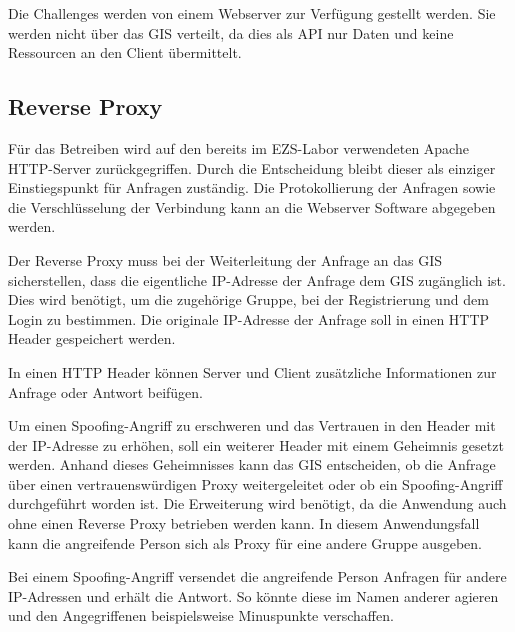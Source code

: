 Die Challenges werden von einem Webserver zur Verfügung gestellt werden. Sie werden nicht über das GIS verteilt, da dies als API nur Daten und keine Ressourcen an den Client übermittelt.

\subsection{Reverse Proxy}
Für das Betreiben wird auf den bereits im EZS-Labor verwendeten Apache HTTP-Server zurückgegriffen. Durch die Entscheidung bleibt dieser als einziger Einstiegspunkt für Anfragen zuständig. Die Protokollierung der Anfragen sowie die Verschlüsselung der Verbindung kann an die Webserver Software abgegeben werden.

Der Reverse Proxy muss bei der Weiterleitung der Anfrage an das GIS sicherstellen, dass die eigentliche IP-Adresse der Anfrage dem GIS zugänglich ist. Dies wird benötigt, um die zugehörige Gruppe, bei der Registrierung und dem Login zu bestimmen. Die originale IP-Adresse der Anfrage soll in einen HTTP Header gespeichert werden.

In einen HTTP Header können Server und Client zusätzliche Informationen zur Anfrage oder Antwort beifügen. \cite{mdncontributorsHTTPHeaders2020}

Um einen Spoofing-Angriff zu erschweren und das Vertrauen in den Header mit der IP-Adresse zu erhöhen, soll ein weiterer Header mit einem Geheimnis gesetzt werden. Anhand dieses Geheimnisses kann das GIS entscheiden, ob die Anfrage über einen vertrauenswürdigen Proxy weitergeleitet oder ob ein Spoofing-Angriff durchgeführt worden ist. Die Erweiterung wird benötigt, da die Anwendung auch ohne einen Reverse Proxy betrieben werden kann. In diesem Anwendungsfall kann die angreifende Person sich als Proxy für eine andere Gruppe ausgeben.

Bei einem Spoofing-Angriff versendet die angreifende Person Anfragen für andere IP-Adressen und erhält die Antwort. So könnte diese im Namen anderer agieren und den Angegriffenen beispielsweise Minuspunkte verschaffen.